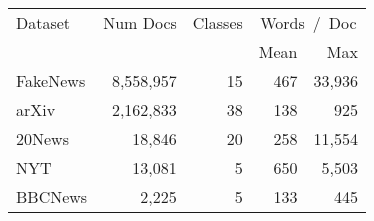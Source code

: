 {
\small
\begin{tabular}{lrrrr}%
\toprule
Dataset & Num Docs & Classes & \multicolumn{2}{c}{Words~/~Doc} \\%
    \cmidrule{4-5}
& & & Mean&  Max \\
\midrule
FakeNews &8,558,957 &15 &467 &33,936 \\%
arXiv &2,162,833 &38 &138 &925 \\%
20News &18,846 &20 &258 &11,554 \\%
NYT &13,081 &5 &650 &5,503 \\%
BBCNews &2,225 &5 &133 &445 \\%
\bottomrule
\end{tabular}
}
